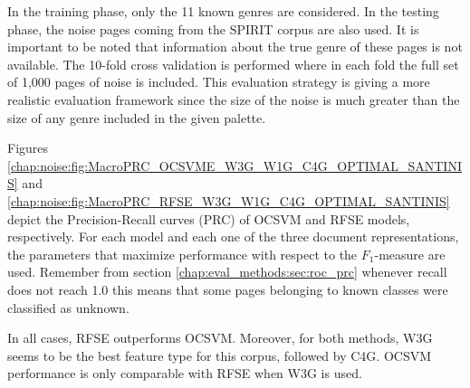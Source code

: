 In the training phase, only the 11 known genres are considered. In the testing phase, the noise pages coming from the SPIRIT corpus are also used. It is important to be noted that information about the true genre of these pages is not available. The 10-fold cross validation is performed where in each fold the full set of 1,000 pages of noise is included. This evaluation strategy is giving a more realistic evaluation framework since the size of the noise is much greater than the size of any genre included in the given palette.

Figures \ref{chap:noise:fig:MacroPRC_OCSVME_W3G_W1G_C4G_OPTIMAL_SANTINIS} and \ref{chap:noise:fig:MacroPRC_RFSE_W3G_W1G_C4G_OPTIMAL_SANTINIS} depict the Precision-Recall curves (PRC) of OCSVM and RFSE models, respectively. For each model and each one of the three document representations, the parameters that maximize performance with respect to the $F_{1}$-measure are used. Remember from section \ref{chap:eval_methods:sec:roc_prc} whenever recall does not reach 1.0 this means that some pages belonging to known classes were classified as unknown. 

In all cases, RFSE outperforms OCSVM. Moreover, for both methods, W3G seems to be the best feature type for this corpus, followed by C4G. OCSVM performance is only comparable with RFSE when W3G is used.

\hfill \break



